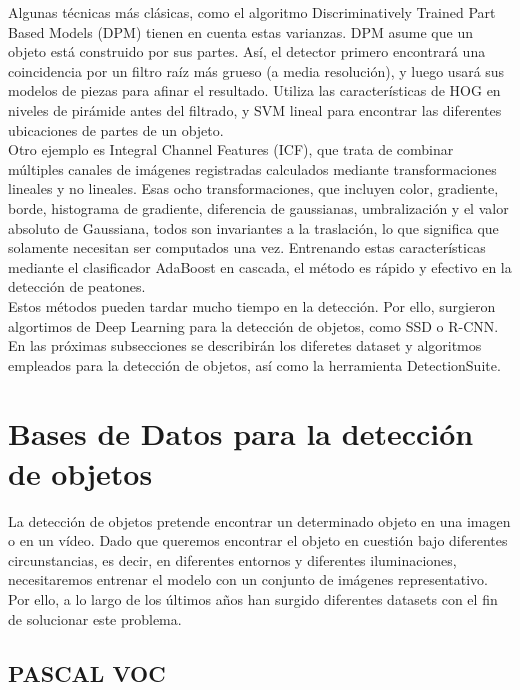\documentclass{bmvc2k}
\begin{document}
Algunas técnicas más clásicas, como el algoritmo Discriminatively Trained Part Based Models (DPM) tienen en cuenta estas varianzas. DPM asume que un objeto está construido por sus partes. Así,
el detector primero encontrará una coincidencia por un filtro raíz más grueso (a media resolución), y luego usará sus modelos de piezas para afinar el resultado. Utiliza las características de HOG en niveles de pirámide antes del filtrado, y SVM lineal para encontrar las diferentes ubicaciones de partes de un objeto.\\

Otro ejemplo es Integral Channel Features (ICF), que trata de combinar múltiples canales de imágenes registradas calculados mediante transformaciones lineales y no lineales. Esas ocho transformaciones, que incluyen color, gradiente, borde, histograma de gradiente, diferencia de gaussianas, umbralización y el valor absoluto de Gaussiana, todos son invariantes a la traslación, lo que significa que solamente necesitan ser computados una vez. Entrenando estas características mediante el clasificador AdaBoost en cascada, el método es rápido y efectivo en la detección de peatones.\\

Estos métodos pueden tardar mucho tiempo en la detección. Por ello, surgieron algortimos de Deep Learning para la detección de objetos, como SSD o R-CNN.\\

En las próximas subsecciones se describirán los diferetes dataset y algoritmos empleados para la detección de objetos, así como la herramienta DetectionSuite.\\

\section{Bases de Datos para la detección de objetos}
La detección de objetos pretende encontrar un determinado objeto en una imagen o en un vídeo. Dado que queremos encontrar el objeto en cuestión bajo diferentes circunstancias, es decir, en diferentes entornos y diferentes iluminaciones, necesitaremos entrenar el modelo con un conjunto de imágenes representativo. Por ello, a lo largo de los últimos años han surgido diferentes datasets con el fin de solucionar este problema.\\

\subsection{PASCAL VOC}
\end{document}
